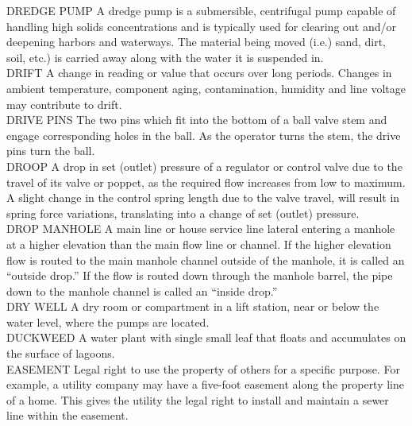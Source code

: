 \documentclass{article}
\begin{document}
DREDGE PUMP
A dredge pump is a submersible, centrifugal pump capable of handling high solids concentrations and is typically used for clearing out and/or deepening harbors and waterways. The material being moved (i.e.) sand, dirt, soil, etc.) is carried away along with the water it is suspended in.
\vspace{0.3cm}\\
DRIFT
A change in reading or value that occurs over long periods. Changes in ambient temperature, component aging, contamination, humidity and line voltage may contribute to drift.
\vspace{0.3cm}\\
DRIVE PINS
The two pins which fit into the bottom of a ball valve stem and engage corresponding holes in the ball. As the operator turns the stem, the drive pins turn the ball.
\vspace{0.3cm}\\
DROOP
A drop in set (outlet) pressure of a regulator or control valve due to the travel of its valve or poppet, as the required flow increases from low to maximum. A slight change in the control spring length due to the valve travel, will result in spring force variations, translating into a change of set (outlet) pressure.
\vspace{0.3cm}\\
DROP MANHOLE
A main line or house service line lateral entering a manhole at a higher elevation than the main flow line or channel. If the higher elevation flow is routed to the main manhole channel outside of the manhole, it is called an “outside drop.” If the flow is routed down through the manhole barrel, the pipe down to the manhole channel is called an “inside drop.” 
\vspace{0.3cm}\\
DRY WELL
A dry room or compartment in a lift station, near or below the water level, where the pumps are located. 
\vspace{0.3cm}\\
DUCKWEED
A water plant with single small leaf that floats and accumulates on the surface of lagoons.
\vspace{0.3cm}\\
EASEMENT
Legal right to use the property of others for a specific purpose. For example, a utility company may have a five-foot easement along the property line of a home. This gives the utility the legal right to install and maintain a sewer line within the easement. 
\vspace{0.3cm}\\
\end{document}
